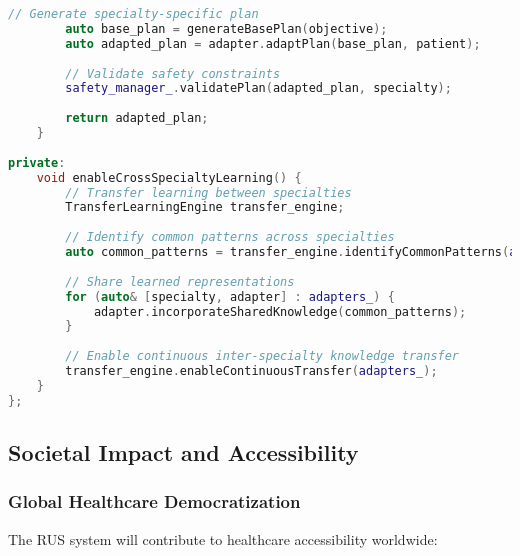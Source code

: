 \begin{lstlisting}[language=C++, caption={Multi-Specialty Adaptation Framework}, label={lst:multi-specialty}]
        // Generate specialty-specific plan
        auto base_plan = generateBasePlan(objective);
        auto adapted_plan = adapter.adaptPlan(base_plan, patient);
        
        // Validate safety constraints
        safety_manager_.validatePlan(adapted_plan, specialty);
        
        return adapted_plan;
    }
    
private:
    void enableCrossSpecialtyLearning() {
        // Transfer learning between specialties
        TransferLearningEngine transfer_engine;
        
        // Identify common patterns across specialties
        auto common_patterns = transfer_engine.identifyCommonPatterns(adapters_);
        
        // Share learned representations
        for (auto& [specialty, adapter] : adapters_) {
            adapter.incorporateSharedKnowledge(common_patterns);
        }
        
        // Enable continuous inter-specialty knowledge transfer
        transfer_engine.enableContinuousTransfer(adapters_);
    }
};
\end{lstlisting}

\subsection{Societal Impact and Accessibility}

\subsubsection{Global Healthcare Democratization}
The RUS system will contribute to healthcare accessibility worldwide:

